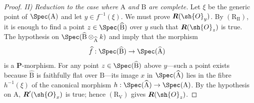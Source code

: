 \begin{proof}
\emph{II) Reduction to the case where $\mathrm{A}$ and $\mathrm{B}$ are complete.} Let $\xi$ be the generic point of $\Spec(\mathrm{A})$ and let $y\in f^{-1}(\xi)$. We must prove $\boldsymbol{R}(\sh{O}_y)$. By $(\mathrm{R}_{\mathrm{II}})$, it is enough to find a point $z\in\Spec(\widehat{\mathrm{B}})$ over $y$ such that $\boldsymbol{R}(\sh{O}_z)$ is true. The hypothesis on $\Spec(\widehat{\mathrm{B}}\otimes_{\widehat{\mathrm{A}}}k)$ and  imply that the morphism
\[
  \widehat{f}:\Spec(\widehat{\mathrm{B}})\to\Spec(\widehat{\mathrm{A}})
\]
is a $\boldsymbol{P}$-morphism. For any point $z\in\Spec(\widehat{\mathrm{B}})$ above $y$---such a point exists because $\widehat{\mathrm{B}}$ is faithfully flat over $\mathrm{B}$---its image $x$ in $\Spec(\widehat{\mathrm{A}})$ lies in the fibre $h^{-1}(\xi)$ of the canonical morphism $h:\Spec(\widehat{\mathrm{A}})\to\Spec(\mathrm{A})$. By the hypothesis on $\mathrm{A}$, $\boldsymbol{R}'(\sh{O}_x)$ is true; hence $(\mathrm{R}_{\mathrm{V}})$ gives $\boldsymbol{R}(\sh{O}_z)$.
\end{proof}

